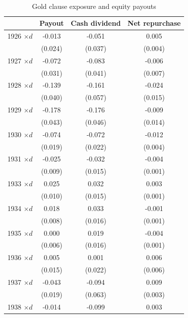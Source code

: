 \begin{table}[p]\centering
\caption{\\ Gold clause exposure and equity payouts  }  \footnotesize \label{tab:div_main} \renewcommand{\arraystretch}{1.2}
\begin{tabular}{lccc}
\toprule
 & Payout & Cash dividend & Net repurchase \\
\midrule
1926 $\times d$ & -0.013 & -0.051 & 0.005 \\
                & (0.024) & (0.037) & (0.004) \\
1927 $\times d$ & -0.072\sym{**} & -0.083\sym{*} & -0.006 \\
                & (0.031) & (0.041) & (0.007) \\
1928 $\times d$ & -0.139\sym{***} & -0.161\sym{**} & -0.024 \\
                & (0.040) & (0.057) & (0.015) \\
1929 $\times d$ & -0.178\sym{***} & -0.176\sym{***} & -0.009 \\
                & (0.043) & (0.046) & (0.014) \\
1930 $\times d$ & -0.074\sym{***} & -0.072\sym{***} & -0.012\sym{**} \\
                & (0.019) & (0.022) & (0.004) \\
1931 $\times d$ & -0.025\sym{**} & -0.032\sym{**} & -0.004\sym{***} \\
                & (0.009) & (0.015) & (0.001) \\
1933 $\times d$ & 0.025\sym{**} & 0.032\sym{*} & 0.003\sym{**} \\
                & (0.010) & (0.015) & (0.001) \\
1934 $\times d$ & 0.018\sym{*} & 0.033\sym{*} & -0.001 \\
                & (0.008) & (0.016) & (0.001) \\
1935 $\times d$ & 0.000 & 0.019 & -0.004\sym{**} \\
                & (0.006) & (0.016) & (0.001) \\
1936 $\times d$ & 0.005 & 0.001 & 0.006 \\
                & (0.015) & (0.022) & (0.006) \\
1937 $\times d$ & -0.043\sym{**} & -0.094 & 0.009\sym{**} \\
                & (0.019) & (0.063) & (0.003) \\
1938 $\times d$ & -0.014 & -0.099 & 0.003\sym{***} \\

\end{tabular}
\end{table}
